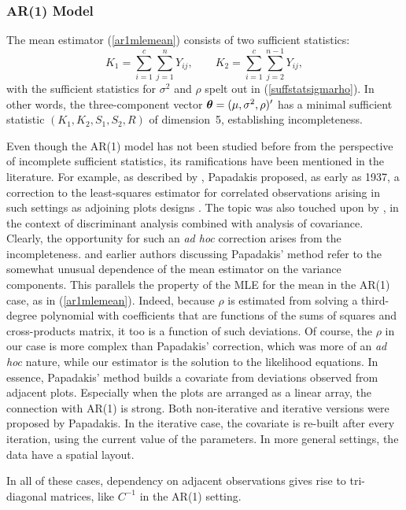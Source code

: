 \documentclass[11pt,a5paper,twoside]{book}
\newcommand{\bftheta}{\mbox{\boldmath $\theta$}}
\begin{document}
\subsubsection{AR(1) Model}

The mean estimator (\ref{ar1mlemean}) consists of two sufficient statistics:
\begin{equation}
K_1=\sum_{i=1}^c\sum_{j=1}^nY_{ij},\qquad
K_2=\sum_{i=1}^c\sum_{j=2}^{n-1}Y_{ij},
\end{equation}
with the sufficient statistics for $\sigma^2$ and $\rho$ spelt out in (\ref{suffstatsigmarho}). In other words, the three-component vector $\bftheta=(\mu,\sigma^2,\rho)'$ has a minimal sufficient statistic $(K_1,K_2,S_1,S_2,R)$ of dimension~5, establishing incompleteness.

Even though the AR(1) model has not been studied before from the perspective of incomplete sufficient statistics, its ramifications have been mentioned in the literature. For example, as described by \cite{M06}, Papadakis proposed, as early as 1937, a correction to the least-squares estimator for correlated observations arising in such settings as adjoining plots designs \citep{P37,B38,B76,B78}. The topic was also touched upon by \cite{CB48}, in the context of discriminant analysis combined with analysis of covariance. Clearly, the opportunity for such an {\em ad hoc\/} correction arises from the incompleteness. \cite{M06} and earlier authors discussing Papadakis' method refer to the somewhat unusual dependence of the mean estimator on the variance components. This parallels the property of the MLE for the mean in the AR(1) case, as in (\ref{ar1mlemean}). Indeed, because $\rho$ is estimated from solving a third-degree polynomial with coefficients that are functions of the sums of squares and cross-products matrix, it too is a function of such deviations. Of course, the $\rho$ in our case is more complex than Papadakis' correction, which was more of an {\em ad hoc\/} nature, while our estimator is the solution to the likelihood equations. In essence, Papadakis' method builds a covariate from deviations observed from adjacent plots. Especially when the plots are arranged as a linear array, the connection with AR(1) is strong. Both non-iterative and iterative versions were proposed by Papadakis. In the iterative case, the covariate is re-built after every iteration, using the current value of the parameters.  In more general settings, the data have a spatial layout.

In all of these cases, dependency on adjacent observations gives rise to tri-diagonal matrices, like $C^{-1}$ in the AR(1) setting.
\end{document}
